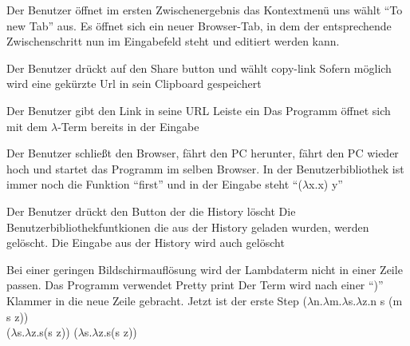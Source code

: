 \documentclass[parskip=full,11pt,twoside]{scrartcl}
\begin{document}
{Der Benutzer öffnet im ersten Zwischenergebnis das Kontextmenü uns wählt \enquote{To new Tab} aus.}
{Es öffnet sich ein neuer Browser-Tab, in dem der entsprechende Zwischenschritt nun im Eingabefeld steht und editiert werden kann.}

{ Der Benutzer drückt auf den Share button und wählt copy-link}
{ Sofern möglich wird eine gekürzte Url in sein Clipboard gespeichert }

{Der Benutzer gibt den Link in seine URL Leiste ein }
{ Das Programm öffnet sich mit dem $\lambda$-Term bereits in der Eingabe }

{Der Benutzer schließt den Browser, fährt den PC herunter, fährt den PC wieder hoch und startet das Programm im selben Browser.}
{In der Benutzerbibliothek ist immer noch die Funktion \enquote{first} und in der Eingabe steht \enquote{($\lambda$x.x) y}}

{Der Benutzer drückt den Button der die History löscht}
{Die Benutzerbibliothekfuntkionen die aus der History geladen wurden, werden gelöscht. Die Eingabe aus der History wird auch gelöscht}


{Bei einer geringen Bildschirmauflösung wird der Lambdaterm nicht in einer Zeile passen. Das Programm verwendet Pretty print }
{Der Term wird nach einer \enquote{)} Klammer in die neue Zeile gebracht. Jetzt ist der erste Step \newline ($\lambda$n.$\lambda$m.$\lambda$s.$\lambda$z.n s (m s z))
	\\
	($\lambda$s.$\lambda$z.s(s z)) ($\lambda$s.$\lambda$z.s(s z)) }
\end{document}
